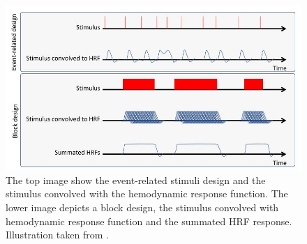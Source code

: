 \begin{figure}[H]                 
	\includegraphics[width=.8\textwidth]{figures/aBackground/event_vs_block}  
	\caption{The top image show the event-related stimuli design and the stimulus convolved with the hemodynamic response function. The lower image depicts a block design, the stimulus convolved with hemodynamic response function and the summated HRF response. Illustration taken from \cite{Moayedi2018}.}
	\label{fig:back:e_vs_b} 
\end{figure}

 

